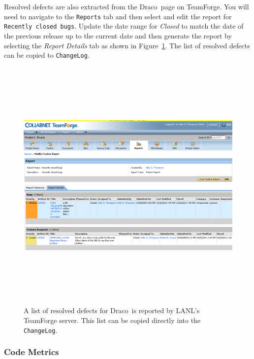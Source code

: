\documentclass[note]{newmemo}
\newcommand{\draco}{{\normalfont\small\sffamily Draco}}
\begin{document}
Resolved defects are also extracted from the \draco\ page on
TeamForge.  You will need to navigate to the \texttt{Reports} tab and
then select and edit the report for \texttt{Recently closed bugs}.
Update the date range for \textit{Closed} to match the date of the
previous release up to the current date and then generate the report
by selecting the \textit{Report Details} tab as shown in
Figure~\ref{fig:sample-resolved-defect-list}.  The list of resolved
defects can be copied to \texttt{ChangeLog}.

\begin{figure}
  \centerline{ \includegraphics[height=5.0in, angle=90]
{sample-resolved-defect-list.png}}
  \caption{A list of resolved defects for \draco\ is reported by
    LANL's TeamForge server.  This list can be copied directly into
    the \texttt{ChangeLog}.}
  \label{fig:sample-resolved-defect-list}
\end{figure}


\subsubsection{Code Metrics}
\label{sec:code_metric}
\end{document}
